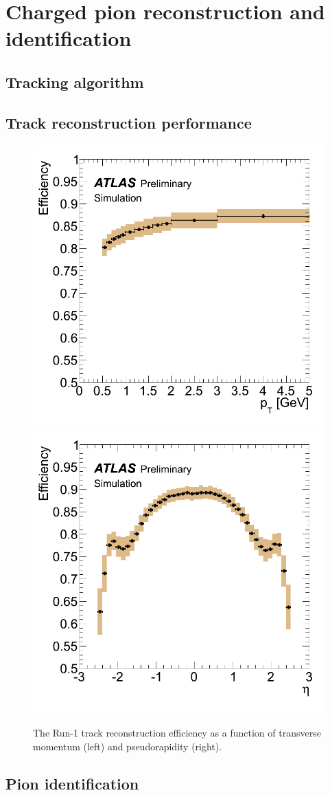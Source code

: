 \chapter{Charged pion reconstruction and identification}
\label{ch:reconstruction}
\graphicspath{{Chapter-Reconstruction/figures/}}


\section{Tracking algorithm}

\cite{Aad:2010bx} %
\cite{Cornelissen:2007vba} %

\section{Track reconstruction performance}

\begin{figure}[t]
  \includegraphics[width=0.49\linewidth]{atl_com_phys_2012_1541_fig_07_eff_pt.png}
  \includegraphics[width=0.49\linewidth]{atl_com_phys_2012_1541_fig_08_eff_eta.png}
  \caption{The Run-1 track reconstruction efficiency as a function of transverse momentum (left) and pseudorapidity (right).}
  \label{fig:trk_eff}
\end{figure}

\section{Pion identification}


